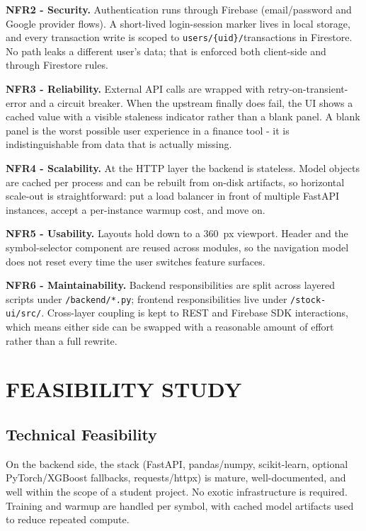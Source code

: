 \documentclass[12pt,a4paper]{report}
\numberwithin{equation}{chapter}
\begin{document}
\textbf{NFR2 - Security.} Authentication runs through Firebase (email/password and Google provider flows). A short-lived login-session marker lives in local storage, and every transaction write is scoped to \texttt{users/\{uid\}/}transactions in Firestore. No path leaks a different user's data; that is enforced both client-side and through Firestore rules.

\textbf{NFR3 - Reliability.} External API calls are wrapped with retry-on-transient-error and a circuit breaker. When the upstream finally does fail, the UI shows a cached value with a visible staleness indicator rather than a blank panel. A blank panel is the worst possible user experience in a finance tool - it is indistinguishable from data that is actually missing.

\textbf{NFR4 - Scalability.} At the HTTP layer the backend is stateless. Model objects are cached per process and can be rebuilt from on-disk artifacts, so horizontal scale-out is straightforward: put a load balancer in front of multiple FastAPI instances, accept a per-instance warmup cost, and move on.

\textbf{NFR5 - Usability.} Layouts hold down to a 360~px viewport. Header and the symbol-selector component are reused across modules, so the navigation model does not reset every time the user switches feature surfaces.

\textbf{NFR6 - Maintainability.} Backend responsibilities are split across layered scripts under \texttt{/backend/*.py}; frontend responsibilities live under \texttt{/stock-ui/src/}. Cross-layer coupling is kept to REST and Firebase SDK interactions, which means either side can be swapped with a reasonable amount of effort rather than a full rewrite.

\section{FEASIBILITY STUDY}

\subsection{Technical Feasibility}

On the backend side, the stack (FastAPI, pandas/numpy, scikit-learn, optional PyTorch/XGBoost fallbacks, requests/httpx) is mature, well-documented, and well within the scope of a student project. No exotic infrastructure is required. Training and warmup are handled per symbol, with cached model artifacts used to reduce repeated compute.
\end{document}
